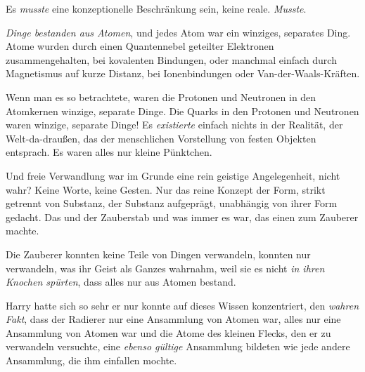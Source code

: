 Es \emph{musste} eine konzeptionelle Beschränkung sein, keine reale. \emph{Musste}.

\emph{Dinge bestanden aus Atomen}, und jedes Atom war ein winziges, separates Ding. Atome wurden durch einen Quantennebel geteilter Elektronen zusammengehalten, bei kovalenten Bindungen, oder manchmal einfach durch Magnetismus auf kurze Distanz, bei Ionenbindungen oder Van-der-Waals-Kräften.

Wenn man es so betrachtete, waren die Protonen und Neutronen in den Atomkernen winzige, separate Dinge. Die Quarks in den Protonen und Neutronen waren winzige, separate Dinge! Es \emph{existierte} einfach nichts in der Realität, der Welt-da-draußen, das der menschlichen Vorstellung von festen Objekten entsprach. Es waren alles nur kleine Pünktchen.

Und freie Verwandlung war im Grunde eine rein geistige Angelegenheit, nicht wahr? Keine Worte, keine Gesten. Nur das reine Konzept der Form, strikt getrennt von Substanz, der Substanz aufgeprägt, unabhängig von ihrer Form gedacht. Das und der Zauberstab und was immer es war, das einen zum Zauberer machte.

Die Zauberer konnten keine Teile von Dingen verwandeln, konnten nur verwandeln, was ihr Geist als Ganzes wahrnahm, weil sie es nicht \emph{in ihren Knochen spürten}, dass alles nur aus Atomen bestand.

Harry hatte sich so sehr er nur konnte auf dieses Wissen konzentriert, den \emph{wahren Fakt}, dass der Radierer nur eine Ansammlung von Atomen war, alles nur eine Ansammlung von Atomen war und die Atome des kleinen Flecks, den er zu verwandeln versuchte, eine \emph{ebenso gültige} Ansammlung bildeten wie jede andere Ansammlung, die ihm einfallen mochte.

